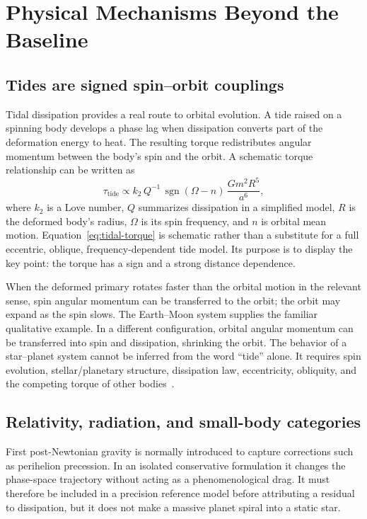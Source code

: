 \documentclass[10pt,conference]{IEEEtran}
\begin{document}
\section{Physical Mechanisms Beyond the Baseline}
\label{sec:mechanisms}

\subsection{Tides are signed spin--orbit couplings}

Tidal dissipation provides a real route to orbital evolution. A tide raised on a spinning body develops a phase lag when dissipation converts part of the deformation energy to heat. The resulting torque redistributes angular momentum between the body's spin and the orbit. A schematic torque relationship can be written as
\begin{equation}
\tau_{\mathrm{tide}}\propto k_2\,Q^{-1}\,\operatorname{sgn}(\Omega-n)\,\frac{Gm^2R^5}{a^6},
\label{eq:tidal-torque}
\end{equation}
where $k_2$ is a Love number, $Q$ summarizes dissipation in a simplified model, $R$ is the deformed body's radius, $\Omega$ is its spin frequency, and $n$ is orbital mean motion. Equation~\eqref{eq:tidal-torque} is schematic rather than a substitute for a full eccentric, oblique, frequency-dependent tide model. Its purpose is to display the key point: the torque has a sign and a strong distance dependence.

When the deformed primary rotates faster than the orbital motion in the relevant sense, spin angular momentum can be transferred to the orbit; the orbit may expand as the spin slows. The Earth--Moon system supplies the familiar qualitative example. In a different configuration, orbital angular momentum can be transferred into spin and dissipation, shrinking the orbit. The behavior of a star--planet system cannot be inferred from the word ``tide'' alone. It requires spin evolution, stellar/planetary structure, dissipation law, eccentricity, obliquity, and the competing torque of other bodies~\cite{hut1981}.

\subsection{Relativity, radiation, and small-body categories}

First post-Newtonian gravity is normally introduced to capture corrections such as perihelion precession. In an isolated conservative formulation it changes the phase-space trajectory without acting as a phenomenological drag. It must therefore be included in a precision reference model before attributing a residual to dissipation, but it does not make a massive planet spiral into a static star.
\end{document}

